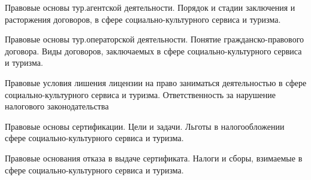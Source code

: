 \documentclass[
	14pt,
	a4paper,
	]
	{scrartcl}
\begin{document}
\vfill
\z Правовые основы тур.агентской деятельности.
 \vfill
\z Порядок  и стадии заключения и расторжения договоров, в сфере социально-культурного сервиса и туризма.
 \vfill

\vfill

\newpage


\shapk
{}
\setcounter{zad}{0}

\vfill
\z Правовые основы тур.операторской деятельности.
 \vfill
\z Понятие гражданско-правового договора. Виды договоров, заключаемых в сфере социально-культурного сервиса и туризма.
 \vfill

\vfill

\newpage


\shapk
{}
\setcounter{zad}{0}

\vfill
\z Правовые условия лишения лицензии на право заниматься деятельностью в сфере социально-культурного сервиса и туризма.
 \vfill
\z Ответственность за нарушение налогового законодательства
 \vfill

\vfill

\newpage


\shapk
{}
\setcounter{zad}{0}

\vfill
\z Правовые основы сертификации. Цели и задачи.
 \vfill
\z Льготы в налогообложении сфере социально-культурного сервиса и туризма.
 \vfill

\vfill

\newpage


\shapk
{}
\setcounter{zad}{0}

\vfill
\z Правовые основания отказа в выдаче сертификата.
 \vfill
\z Налоги и сборы, взимаемые в сфере социально-культурного сервиса и туризма.
 \vfill

\vfill

\newpage
\end{document}
